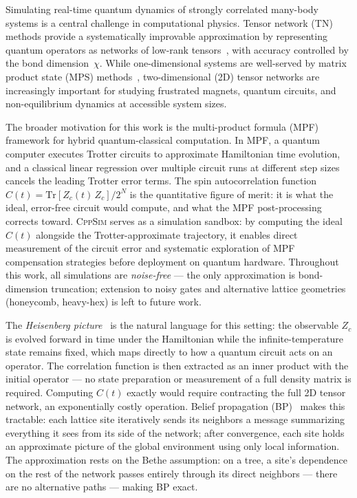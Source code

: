 \documentclass[11pt]{article}
\begin{document}
Simulating real-time quantum dynamics of strongly correlated many-body systems is
a central challenge in computational physics. Tensor network (TN) methods provide
a systematically improvable approximation by representing quantum operators as
networks of low-rank tensors~\citep{orus2014practical}, with accuracy controlled
by the bond dimension~$\chi$. While one-dimensional systems are well-served by
matrix product state (MPS) methods~\citep{vidal2003efficient}, two-dimensional
(2D) tensor networks are increasingly important for studying frustrated magnets,
quantum circuits, and non-equilibrium dynamics at accessible system sizes.

The broader motivation for this work is the multi-product formula (MPF)
framework for hybrid quantum-classical computation. In MPF, a quantum computer
executes Trotter circuits to approximate Hamiltonian time evolution, and a
classical linear regression over multiple circuit runs at different step sizes
cancels the leading Trotter error terms. The spin autocorrelation function
$C(t) = \mathrm{Tr}[Z_c(t)\,Z_c]/2^N$ is the quantitative figure of merit:
it is what the ideal, error-free circuit would compute, and what the MPF
post-processing corrects toward. \textsc{CppSim} serves as a simulation sandbox: by computing the
ideal $C(t)$ alongside the Trotter-approximate trajectory, it enables
direct measurement of the circuit error and systematic exploration of
MPF compensation strategies before deployment on quantum hardware.
Throughout this work, all simulations are \emph{noise-free} ---
the only approximation is bond-dimension truncation; extension to
noisy gates and alternative lattice geometries (honeycomb, heavy-hex)
is left to future work.

The \emph{Heisenberg picture}~\citep{rudolph2025simulating} is the natural
language for this setting: the observable $Z_c$ is evolved forward in time
under the Hamiltonian while the infinite-temperature state remains fixed,
which maps directly to how a quantum circuit acts on an operator.
The correlation function is then extracted as an inner product with the
initial operator — no state preparation or measurement of a full density
matrix is required.
Computing $C(t)$ exactly would require contracting the full 2D tensor
network, an exponentially costly operation.
Belief propagation (BP)~\citep{tindall2023gauging} makes this tractable:
each lattice site iteratively sends its neighbors a message summarizing
everything it sees from its side of the network; after convergence, each
site holds an approximate picture of the global environment using only
local information.
The approximation rests on the Bethe assumption: on a tree, a site's
dependence on the rest of the network passes entirely through its direct
neighbors — there are no alternative paths — making BP exact.
\end{document}
